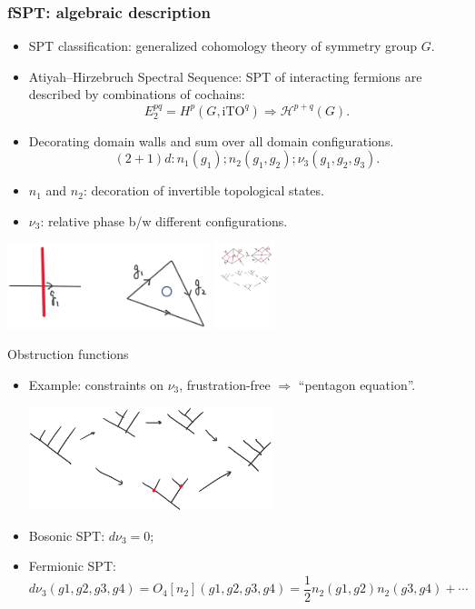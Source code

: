 \documentclass[xcolor=table, 11pt, aspectratio=169]{beamer}
\begin{document}
\begin{frame}
  \frametitle{fSPT: algebraic description}
  \begin{itemize}
    \item SPT classification: generalized cohomology theory of symmetry group $G$.
    \item Atiyah–Hirzebruch Spectral Sequence: SPT of interacting fermions are described by combinations of cochains:
      \[E^{pq}_2=H^p(G, \text{iTO}^q)\Rightarrow
      \mathcal H^{p+q}(G).\]
    \item Decorating domain walls and sum over all domain configurations.
      \[(2+1)d: n_1(g_1); n_2(g_1, g_2); \nu_3(g_1,g_2,g_3).\]
    \item $n_1$ and $n_2$: decoration of invertible topological states.
    \item $\nu_3$: relative phase b/w different configurations.
  \end{itemize}
  \begin{center}
    \includegraphics[height=2.5cm]{fspt_decor.jpg}
    \includegraphics[height=2.5cm]{fmove2.pdf}
  \end{center}
\end{frame}

\begin{frame}{Obstruction functions}
  \begin{itemize}
    \item Example: constraints on $\nu_3$, frustration-free $\Rightarrow$ ``pentagon equation''.
    \begin{center}
      \includegraphics[height=3cm]{pentagon}        
    \end{center}
    \item Bosonic SPT: $d\nu_3=0$;
    \item Fermionic SPT:
    \[d\nu_3(g1, g2, g3, g4)=O_4[n_2](g1, g2, g3, g4)=\frac12 n_2(g1, g2) n_2(g3, g4) + \cdots\]
  \end{itemize}
\end{frame}
\end{document}
